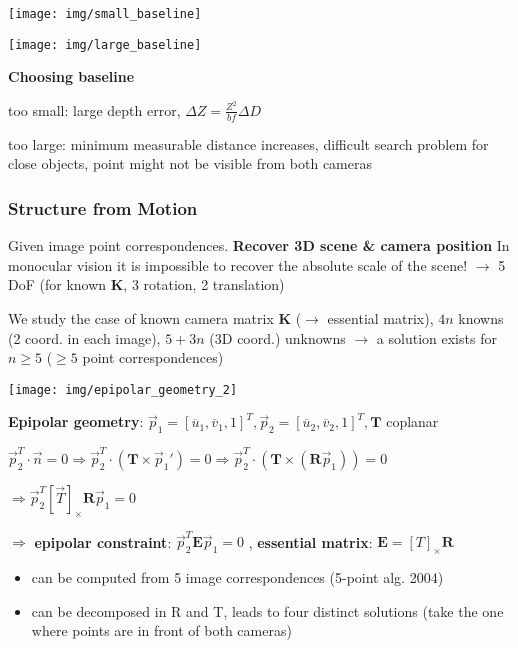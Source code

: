 \documentclass[fontsize=6pt]{scrartcl}
\newcommand{\mat}[1]{\mathbf{#1}}
\begin{document}
\begin{multicols*}{4}
\begin{minipage}{0.16\linewidth}
	\texttt{[image: img/small\_baseline]}
\end{minipage}
\begin{minipage}{0.34\linewidth}
	\texttt{[image: img/large\_baseline]}
\end{minipage}
\begin{minipage}{0.5\linewidth}
\textbf{Choosing baseline}

too small: large depth error, $\Delta Z = \frac{Z^2}{bf} \Delta D$

too large: minimum measurable distance increases, difficult search problem for close objects, point might not be visible from both cameras
\end{minipage}

\subsubsection*{Structure from Motion}

Given image point correspondences. \textbf{Recover 3D scene \& camera position}
In monocular vision it is impossible to recover the absolute scale of the scene! $\rightarrow$ 5 DoF (for known $\mat K$, 3 rotation, 2 translation)

We study the case of known camera matrix $\mat K$ ($\rightarrow$ essential matrix), $4n$ knowns (2 coord. in each image), $5+3n$ (3D coord.) unknowns $\rightarrow$ a solution exists for $n\geq 5$ ($\geq 5$ point correspondences)

\texttt{[image: img/epipolar\_geometry\_2]}

\textbf{Epipolar geometry}: $\vec p_1 = [\overline{u}_1, \overline{v}_1, 1]^T, \vec p_2 = [\overline{u}_2, \overline{v}_2, 1]^T, \mat T$ coplanar

$\vec p_2^T \cdot \vec n = 0 \Rightarrow \vec p_2^T \cdot(\mat T \times \vec p_1')= 0 \Rightarrow \vec p_2^T \cdot (\mat T \times (\mat R \vec p_1)) = 0 $

$\Rightarrow \vec p_2^T[\vec T]_\times \mat R \vec p_1 = 0$

$\Rightarrow $ \textbf{epipolar constraint}: $\vec p_2^T \mat E \vec p_1 = 0 $ , \textbf{essential matrix}: $\mat E = [T]_\times \mat R$

\begin{itemize}
\item can be computed from 5 image correspondences (5-point alg. 2004)
\item can be decomposed in R and T, leads to four distinct solutions (take the one where points are in front of both cameras)
\end{itemize}


\end{multicols*}
\end{document}
